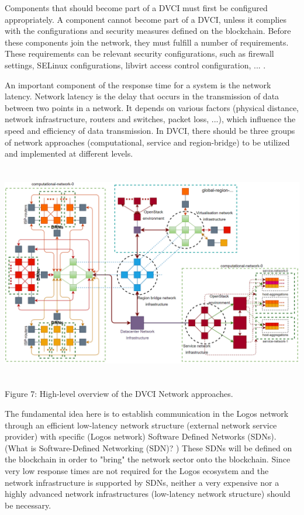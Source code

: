 \documentclass[]{article}
\begin{document}
Components that should become part of a DVCI must first be configured appropriately. 
A component cannot become part of a DVCI, unless it complies with the configurations and security measures defined on the blockchain. 
Before these components join the network, they must fulfill a number of requirements.
These requirements can be relevant security configurations, such as firewall settings, SELinux configurations, libvirt access control configuration, ... .

An important component of the response time for a system is the network latency.
Network latency is the delay that occurs in the transmission of data between two points in a network. 
It depends on various factors (physical distance, network infrastructure, routers and switches, packet loss, ...), which influence the speed and efficiency of data transmission.
In DVCI, there should be three groups of network approaches (computational, service and region-bridge) to be utilized and implemented at different levels.
 
\begin{center}
	\includegraphics[height=9.5cm]{dvci-network-overview}
\end{center}
\begin{center}
	Figure 7: High-level overview of the DVCI Network approaches.
\end{center}

The fundamental idea here is to establish communication in the Logos network through an efficient low-latency network structure (external network service provider) with specific (Logos network) Software Defined Networks (SDNs). (What is Software-Defined Networking (SDN)? \cite{VMwareDoc-sdn})
These SDNs will be defined on the blockchain in order to "bring" the network sector onto the blockchain.
Since very low response times are not required for the Logos ecosystem and the network infrastructure is supported by SDNs, neither a very expensive nor a highly advanced network infrastructures (low-latency network structure) should be necessary.
\newline
\end{document}
